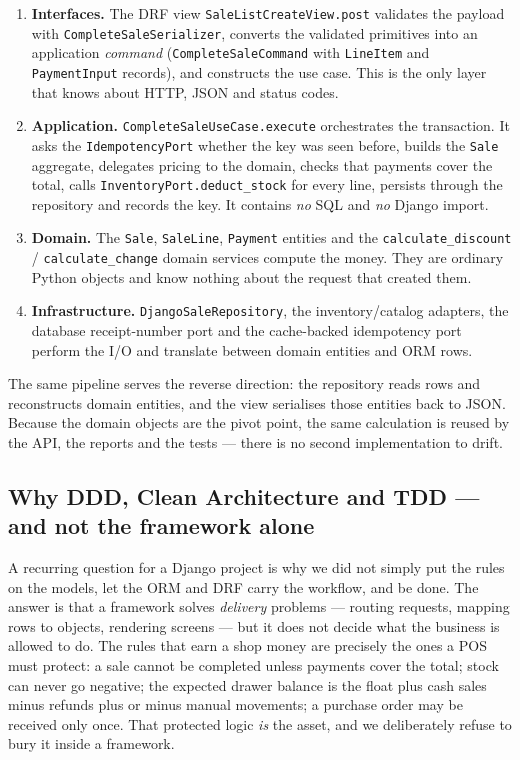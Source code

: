 \documentclass[11pt,a4paper]{article}
\begin{document}
\begin{enumerate}[leftmargin=1.4em]
  \item \textbf{Interfaces.} The DRF view \texttt{SaleListCreateView.post} validates the payload with
  \texttt{CompleteSaleSerializer}, converts the validated primitives into an application
  \emph{command} (\texttt{CompleteSaleCommand} with \texttt{LineItem} and \texttt{PaymentInput}
  records), and constructs the use case. This is the only layer that knows about HTTP, JSON and
  status codes.
  \item \textbf{Application.} \texttt{CompleteSaleUseCase.execute} orchestrates the transaction. It
  asks the \texttt{IdempotencyPort} whether the key was seen before, builds the \texttt{Sale}
  aggregate, delegates pricing to the domain, checks that payments cover the total, calls
  \texttt{InventoryPort.deduct\_stock} for every line, persists through the repository and records
  the key. It contains \emph{no} SQL and \emph{no} Django import.
  \item \textbf{Domain.} The \texttt{Sale}, \texttt{SaleLine}, \texttt{Payment} entities and the
  \texttt{calculate\_discount} / \texttt{calculate\_change} domain services compute the money. They
  are ordinary Python objects and know nothing about the request that created them.
  \item \textbf{Infrastructure.} \texttt{DjangoSaleRepository}, the inventory/catalog adapters, the
  database receipt-number port and the cache-backed idempotency port perform the I/O and translate
  between domain entities and ORM rows.
\end{enumerate}

\noindent
The same pipeline serves the reverse direction: the repository reads rows and reconstructs domain
entities, and the view serialises those entities back to JSON. Because the domain objects are the
pivot point, the same calculation is reused by the API, the reports and the tests --- there is no
second implementation to drift.

\subsection{Why DDD, Clean Architecture and TDD --- and not the framework alone}

A recurring question for a Django project is why we did not simply put the rules on the models, let the
ORM and DRF carry the workflow, and be done. The answer is that a framework solves \emph{delivery}
problems --- routing requests, mapping rows to objects, rendering screens --- but it does not decide
what the business is allowed to do. The rules that earn a shop money are precisely the ones a POS must
protect: a sale cannot be completed unless payments cover the total; stock can never go negative; the
expected drawer balance is the float plus cash sales minus refunds plus or minus manual movements; a
purchase order may be received only once. That protected logic \emph{is} the asset, and we deliberately
refuse to bury it inside a framework.
\end{document}

